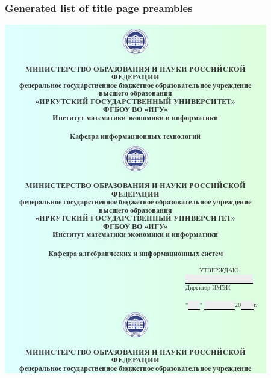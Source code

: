 \documentclass[10pt]{beamer}
\begin{document}
\begin{frame}
  \frametitle{Generated list of title page preambles}
    \begin{adjustwidth}{-2.5em}{-2.5em}
    \begin{center}
      \includegraphics[width=0.7\linewidth]{template-title-pages.jpg}
    \end{center}
  \end{adjustwidth}
\end{frame}
\end{document}

